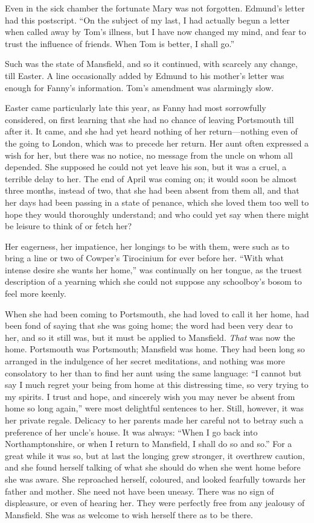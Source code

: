 \documentclass{article}
\begin{document}
Even in the sick chamber the fortunate Mary was
not forgotten.  Edmund's letter had this postscript.
``On the subject of my last, I had actually begun a letter
when called away by Tom's illness, but I have now changed
my mind, and fear to trust the influence of friends.
When Tom is better, I shall go.''

Such was the state of Mansfield, and so it continued,
with scarcely any change, till Easter.  A line occasionally
added by Edmund to his mother's letter was enough for
Fanny's information.  Tom's amendment was alarmingly slow.

Easter came particularly late this year, as Fanny had most
sorrowfully considered, on first learning that she had
no chance of leaving Portsmouth till after it.  It came,
and she had yet heard nothing of her return---nothing even
of the going to London, which was to precede her return.
Her aunt often expressed a wish for her, but there was
no notice, no message from the uncle on whom all depended.
She supposed he could not yet leave his son, but it was a cruel,
a terrible delay to her.  The end of April was coming on;
it would soon be almost three months, instead of two,
that she had been absent from them all, and that her days
had been passing in a state of penance, which she loved
them too well to hope they would thoroughly understand;
and who could yet say when there might be leisure to think
of or fetch her?

Her eagerness, her impatience, her longings to be with them,
were such as to bring a line or two of Cowper's Tirocinium
for ever before her.  ``With what intense desire she wants
her home,'' was continually on her tongue, as the truest
description of a yearning which she could not suppose
any schoolboy's bosom to feel more keenly.

When she had been coming to Portsmouth, she had loved to call
it her home, had been fond of saying that she was going home;
the word had been very dear to her, and so it still was,
but it must be applied to Mansfield.  \emph{That} was now
the home.  Portsmouth was Portsmouth; Mansfield was home.
They had been long so arranged in the indulgence of her
secret meditations, and nothing was more consolatory
to her than to find her aunt using the same language:
``I cannot but say I much regret your being from home
at this distressing time, so very trying to my spirits.
I trust and hope, and sincerely wish you may never be absent
from home so long again,'' were most delightful sentences
to her.  Still, however, it was her private regale.
Delicacy to her parents made her careful not to betray
such a preference of her uncle's house.  It was always:
``When I go back into Northamptonshire, or when I return
to Mansfield, I shall do so and so.''  For a great
while it was so, but at last the longing grew stronger,
it overthrew caution, and she found herself talking of what
she should do when she went home before she was aware.
She reproached herself, coloured, and looked fearfully towards
her father and mother.  She need not have been uneasy.
There was no sign of displeasure, or even of hearing her.
They were perfectly free from any jealousy of Mansfield.
She was as welcome to wish herself there as to be there.
\end{document}
